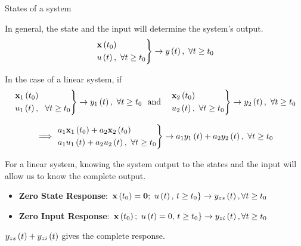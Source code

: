 \documentclass[aspectratio=169]{beamer}
\def\mf{\ensuremath\mathbf}
\def\lp{\ensuremath\left(}
\def\rp{\ensuremath\right)}
\begin{document}
\begin{frame}{States of a system}
\begin{small}
In general, the state and the input will determine the system's output.
\[ \begin{rcases}
\mf{x}\lp t_0 \rp \\
u\lp t\rp, \,\, \forall t \geq t_0
\end{rcases} \rightarrow y\lp t\rp, \,\, \forall t \geq t_0 \]

In the case of a linear system, if 
\[ \begin{rcases}
\mf{x}_1\lp t_0 \rp \\
u_1\lp t\rp, \,\,\,\, \forall t \geq t_0
\end{rcases} \rightarrow y_1\lp t\rp, \,\, \forall t \geq t_0 \,\, \text{ and }\,\,\,\, 
\begin{rcases}
\mf{x}_2\lp t_0 \rp \\
u_2\lp t\rp, \,\, \forall t \geq t_0
\end{rcases} \rightarrow y_2\lp t\rp, \,\, \forall t \geq t_0
\]

\[ \implies \begin{rcases}
a_1\mf{x}_1\lp t_0 \rp + a_2\mf{x}_2\lp t_0 \rp \\
a_1u_1\lp t\rp + a_2u_2\lp t\rp, \,\, \forall t \geq t_0
\end{rcases} \rightarrow a_1y_1\lp t\rp + a_2y_2\lp t\rp, \,\, \forall t \geq t_0
\]

For a linear system, knowing the system output to the states and the input will allow us to know the complete output.

\begin{itemize}
  \item \textbf{Zero State Response}: $\left. \mf{x}\lp t_0\rp = \mf{0}; \,\, u\lp t\rp, \, t \geq t_0\right\} \rightarrow y_{zs}\lp t\rp, \forall t \geq t_0$
  \item \textbf{Zero Input Response}: $\left. \mf{x}\lp t_0\rp; \,\, u\lp t\rp = 0, \, t \geq t_0\right\} \rightarrow y_{zi}\lp t\rp, \forall t \geq t_0$
\end{itemize}

$y_{zs}\lp t\rp + y_{zi}\lp t\rp$ gives the complete response.
\end{small}
\end{frame}
\end{document}
